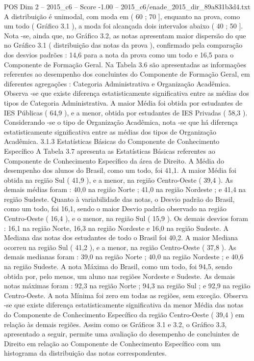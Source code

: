 \begin{textsample}{POS Dim 2 – 2015\_c6 – Score -1.00 – 2015\_c6/enade\_2015\_dir\_89a831b3d4.txt}
A distribuição é unimodal, com moda em ( 60 ; 70 ], enquanto na prova, como um todo ( Gráfico 3.1 ), a moda foi alcançada dois intervalos abaixo ( 40 ; 50 ].
Nota -se, ainda que, no Gráfico 3.2, as notas apresentam maior dispersão do que no Gráfico 3.1 ( distribuição das notas da prova ), confirmado pela comparação dos desvios padrões : 14,6 para a nota da prova como um todo e 16,5 para o Componente de Formação Geral.
Na Tabela 3.6 são apresentadas as informações referentes ao desempenho dos concluintes do Componente de Formação Geral, em diferentes agregações : Categoria Administrativa e Organização Acadêmica.
Observa -se que existe diferença estatisticamente significativa entre as médias dos tipos de Categoria Administrativa.
A maior Média foi obtida por estudantes de IES Públicas ( 64,9 ), e a menor, obtida por estudantes de IES Privadas ( 58,3 ).
Considerando -se o tipo de Organização Acadêmica, nota -se que há diferença estatisticamente significativa entre as médias dos tipos de Organização Acadêmica. 3.1.3 Estatísticas Básicas do Componente de Conhecimento Específico A Tabela 3.7 apresenta as Estatísticas Básicas referentes ao Componente de Conhecimento Específico da área de Direito.
A Média do desempenho dos alunos do Brasil, como um todo, foi 41,1.
A maior Média foi obtida na região Sul ( 41,9 ), e a menor, na região Centro-Oeste ( 39,4 ).
As demais médias foram : 40,0 na região Norte ; 41,0 na região Nordeste ; e 41,4 na região Sudeste.
Quanto à variabilidade das notas, o Desvio padrão do Brasil, como um todo, foi 16,1, sendo o maior Desvio padrão observado na região Centro-Oeste ( 16,4 ), e o menor, na região Sul ( 15,9 ).
Os demais desvios foram : 16,1 na região Norte, 16,3 na região Nordeste e 16,0 na região Sudeste.
A Mediana das notas dos estudantes de todo o Brasil foi 40,2.
A maior Mediana ocorreu na região Sul ( 41,2 ), e a menor, na região Centro-Oeste ( 37,8 ).
As demais medianas foram : 39,0 na região Norte ; 40,0 na região Nordeste ; e 40,6 na região Sudeste.
A nota Máxima do Brasil, como um todo, foi 94,5, sendo obtida por, pelo menos, um aluno nas regiões Nordeste e Sudeste.
As demais notas máximas foram : 92,3 na região Norte ; 94,3 na região Sul ; e 92,9 na região Centro-Oeste.
A nota Mínima foi zero em todas as regiões, sem exceção.
Observa -se que existe diferença estatisticamente significativa da menor Média das notas do Componente de Conhecimento Específico da região Centro-Oeste ( 39,4 ) em relação às demais regiões.
Assim como os Gráficos 3.1 e 3.2, o Gráfico 3.3, apresentado a seguir, permite uma avaliação do desempenho de concluintes de Direito em relação ao Componente de Conhecimento Específico com um histograma da distribuição das notas correspondentes.

\end{textsample}
